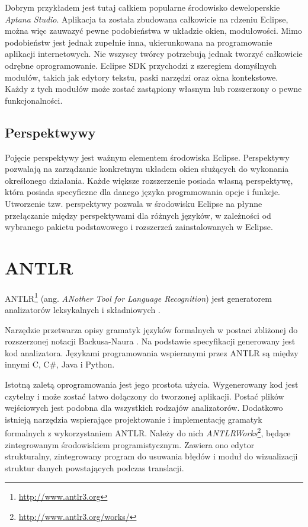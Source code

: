 Dobrym przykładem jest tutaj całkiem popularne środowisko deweloperskie \emph{Aptana Studio}. Aplikacja ta została zbudowana całkowicie na rdzeniu Eclipse, można więc zauwazyć pewne podobieństwa w układzie okien, modułowości. Mimo podobieństw jest jednak zupełnie inna, ukierunkowana na programowanie aplikacji internetowych. Nie wszyscy twórcy potrzebują jednak tworzyć całkowicie odrębne oprogramowanie. Eclipse SDK przychodzi z szeregiem domyślnych modułów, takich jak edytory tekstu, paski narzędzi oraz okna kontekstowe. Każdy z tych modułów może zostać zastąpiony własnym lub rozszerzony o pewne funkcjonalności.

\subsection{Perspektwywy}
Pojęcie perspektywy jest ważnym elementem środowiska Eclipse. Perspektywy pozwalają na zarządzanie konkretnym układem okien służących do wykonania określonego działania. Każde większe rozszerzenie posiada własną perspektywę, która posiada specyficzne dla danego języka programowania opcje i funkcje. Utworzenie tzw. perspektywy pozwala w środowisku Eclipse na płynne przełączanie między perspektywami dla różnych języków, w zależności od wybranego pakietu podstawowego i rozszerzeń zainstalowanych w Eclipse.

\section{ANTLR}
\label{sec:antlrśrodowisko}
ANTLR\footnote{\url{http://www.antlr3.org}} (ang. \emph{ANother Tool for Language Recognition}) jest generatorem
analizatorów leksykalnych i składniowych \cite{antlr}.

Narzędzie przetwarza opisy gramatyk języków formalnych w postaci 
zbliżonej do rozszerzonej notacji
 Backusa-Naura \cite{antlr}. Na podstawie specyfikacji generowany jest kod analizatora.
Językami programowania wspieranymi przez ANTLR są między innymi C, C\#, Java
i Python.

Istotną zaletą oprogramowania jest jego prostota użycia. Wygenerowany kod 
jest czytelny i może zostać łatwo dołączony do tworzonej aplikacji. Postać plików
wejściowych jest podobna dla wszystkich rodzajów analizatorów. Dodatkowo
istnieją narzędzia wspierające projektowanie i implementację gramatyk
formalnych z wykorzystaniem ANTLR. Należy do nich \emph{ANTLRWorks}\footnote{\url{http://www.antlr3.org/works/}}, będące
zintegrowanym środowiskiem programistycznym. Zawiera ono edytor strukturalny,
zintegrowany program do usuwania błędów i moduł do wizualizacji struktur 
danych powstających podczas translacji.

